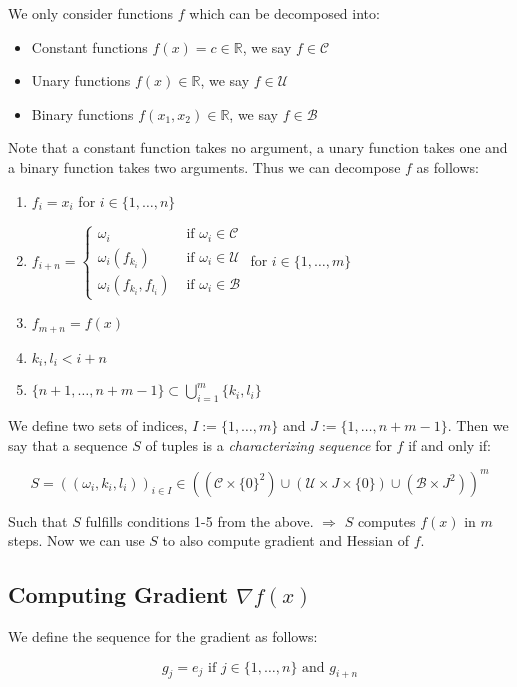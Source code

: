 \documentclass[11pt,a4paper]{article}
\def\R{{\mathbb R}}
\theoremstyle{definition} %
\begin{document}
We only consider functions $f$ which can be decomposed into:

\begin{itemize}
	\item Constant functions $f(x) = c \in \R$, we say $f \in \mathcal{C}$
	\item Unary functions $f(x) \in \R$, we say $f \in \mathcal{U}$
	\item Binary functions $f(x_1, x_2) \in \R$, we say $f \in \mathcal{B}$
\end{itemize}

Note that a constant function takes no argument, a unary function takes one
and a binary function takes two arguments.
Thus we can decompose $f$ as follows:

\begin{enumerate}[(1)]
	\item $f_i = x_i$ for $i \in \{
		      1, \ldots, n
		      \} $
	\item $f_{i + n} = \begin{cases}
			      \omega_i                    & \text{ if } \omega_i \in \mathcal{C} \\
			      \omega_i (f_{k_i})          & \text{ if } \omega_i \in \mathcal{U} \\
			      \omega_i (f_{k_i}, f_{l_i}) & \text{ if } \omega_i \in \mathcal{B}
		      \end{cases}$
	      \qquad for $i \in \{
		      1, \ldots, m
		      \}$
	\item $f_{m + n} = f(x)$
	\item $k_i, l_i < i + n$  
	\item $\{
		      n+1, \ldots, n+m - 1
		      \} \subset \bigcup_{i=1}^{m} \{
		      k_i, l_i
		      \}$
\end{enumerate}

We define two sets of indices, $I := \{
	1, \ldots, m
	\} $ and $J := \{
	1, \ldots, n+m-1
	\} $.
Then we say that a sequence $S$ of tuples is a \textit{characterizing sequence}
for $f$ if and only if:

\[
	S = \left(
	(\omega_i, k_i, l_i)
	\right)_{i \in I}
	\in \left(
	\left(
		\mathcal{C} \times \{
		0
		\}^2
		\right) \cup
	\left(
		\mathcal{U} \times J \times \{
		0
		\} \right) \cup
	\left(
		\mathcal{B} \times J^2
		\right)
	\right) ^m
\]

Such that $S$ fulfills conditions 1-5 from the above.
$\Rightarrow$ $S$ computes $f(x)$ in $m$ steps.
Now we can use $S$ to also compute gradient and Hessian of $f$.

\subsection{Computing Gradient $\nabla f(x)$}

We define the sequence for the gradient as follows:

\[
	g_j = e_j \text{ if } j \in \{
	1, \ldots, n
	\}
	\text{ and }
	g_{i+n}
\]
\end{document}
